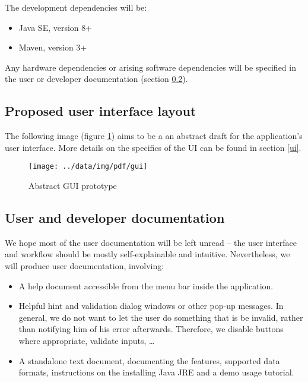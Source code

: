 \documentclass[10pt,a4paper,oneside]{article}
\begin{document}
The development dependencies will be:
\begin{itemize}
\item Java SE, version 8+
\item Maven, version 3+
\end{itemize}

Any hardware dependencies or arising software dependencies will be specified in the user or developer documentation (section \ref{docs}).

\subsection{Proposed user interface layout} \label{ui-layout}

The following image (figure \ref{fig:gui}) aims to be a an abstract draft for the application's user interface.
More details on the specifics of the UI can be found in section \ref{ui}.
\begin{figure}[h]
        \centering
        \texttt{[image: ../data/img/pdf/gui]}
        \caption{Abstract GUI prototype}
        \label{fig:gui}
\end{figure}


\subsection{User and developer documentation} \label{docs}

We hope most of the user documentation will be left unread -- the user interface and workflow should be
mostly self-explainable and intuitive.
Nevertheless, we will produce user documentation, involving:
\begin{itemize}
\item A help document accessible from the menu bar inside the application.
\item Helpful hint and validation dialog windows or other pop-up messages. In general, we do not want to let the user do something that is be invalid, rather than notifying him of his error afterwards. Therefore, we disable buttons where appropriate, validate inputs, \ldots
\item A standalone text document, documenting the features, supported data formats, instructions on the installing Java JRE and a demo usage tutorial.
\end{itemize}
\end{document}
